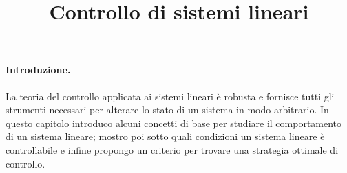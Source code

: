 \title{Controllo di sistemi lineari}
\maketitle
\label{sec:linear-control}

\paragraph{Introduzione.}

La teoria del controllo applicata ai sistemi lineari è robusta e fornisce tutti gli strumenti necessari
per alterare lo stato di un sistema in modo arbitrario.
In questo capitolo introduco alcuni
concetti di base per studiare il comportamento di un sistema lineare; mostro poi sotto quali
condizioni un sistema lineare è controllabile e infine propongo un criterio per trovare una strategia
ottimale di controllo.



